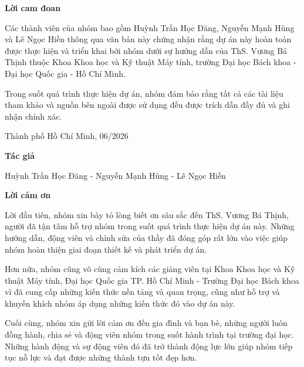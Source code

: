 \newpage
\thispagestyle{empty}
{\Huge \bfseries {Lời cam đoan}}
\vspace{1cm}

Các thành viên của nhóm bao gồm Huỳnh Trần Học Đăng, Nguyễn Mạnh Hùng và Lê Ngọc Hiền thông qua văn bản này chứng nhận rằng dự án này hoàn toàn được thực hiện và triển khai bởi nhóm dưới sự hướng dẫn của ThS. Vương Bá Thịnh thuộc Khoa Khoa học và Kỹ thuật Máy tính, trường Đại học Bách khoa - Đại học Quốc gia - Hồ Chí Minh.

\bigskip

Trong suốt quá trình thực hiện dự án, nhóm đảm bảo rằng tất cả các tài liệu tham khảo và nguồn bên ngoài được sử dụng đều được trích dẫn đầy đủ và ghi nhận chính xác.

\vspace{2cm}

\begin{flushright}
Thành phố Hồ Chí Minh, 06/2026

\medskip

\textbf{Tác giả}

\medskip

Huỳnh Trần Học Đăng - Nguyễn Mạnh Hùng - Lê Ngọc Hiền
\end{flushright}

\newpage


\thispagestyle{empty}

\thispagestyle{empty}
{\Huge \bfseries {Lời cảm ơn}}
\vspace{1cm}

Lời đầu tiên, nhóm xin bày tỏ lòng biết ơn sâu sắc đến ThS. Vương Bá Thịnh, người đã tận tâm hỗ trợ nhóm trong suốt quá trình thực hiện dự án này. Những hướng dẫn, động viên và chỉnh sửa của thầy đã đóng góp rất lớn vào việc giúp nhóm hoàn thiện giai đoạn thiết kế và phát triển dự án.

\bigskip

Hơn nữa, nhóm cũng vô cùng cảm kích các giảng viên tại Khoa Khoa học và Kỹ thuật Máy tính, Đại học Quốc gia TP. Hồ Chí Minh - Trường Đại học Bách khoa vì đã cung cấp những kiến thức nền tảng và quan trọng, cũng như hỗ trợ và khuyến khích nhóm áp dụng những kiến thức đó vào dự án này.

\bigskip

Cuối cùng, nhóm xin gửi lời cảm ơn đến gia đình và bạn bè, những người luôn đồng hành, chia sẻ và động viên nhóm trong suốt hành trình tại trường đại học. Những hành động và sự động viên đó đã trở thành động lực lớn giúp nhóm tiếp tục nỗ lực và đạt được những thành tựu tốt đẹp hơn.

